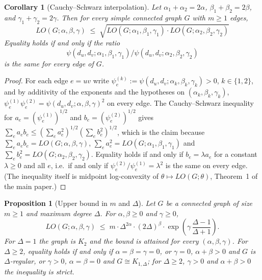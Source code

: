 \documentclass[a5paper, 10pt]{article}
\theoremstyle{plain}
\newtheorem{proposition}[theorem]{Proposition}
\newtheorem*{corollary}{Corollary}
\theoremstyle{remark}
\theoremstyle{definition}
\newcommand{\Wuzi}{LO(G;\alpha,\beta,\gamma)}
\begin{document}
  \begin{corollary}[Cauchy--Schwarz interpolation]\label{thm:cs}
  Let $\alpha_1 + \alpha_2 = 2\alpha$, $\beta_1 + \beta_2 = 2\beta$,
  and $\gamma_1 + \gamma_2 = 2\gamma$. Then for every simple
  connected graph $G$ with $m \ge 1$ edges,
  \[
  LO(G; \alpha, \beta, \gamma)
  \;\le\;
  \sqrt{LO(G; \alpha_1, \beta_1, \gamma_1)
         \cdot LO(G; \alpha_2, \beta_2, \gamma_2)}
  \]
  Equality holds if and only if the ratio
  \[
  \psi(d_u, d_v; \alpha_1, \beta_1, \gamma_1)/\psi(d_u, d_v; \alpha_2,
  \beta_2, \gamma_2)
  \]
  is the same for every edge of $G$.
  \end{corollary}
  \begin{proof}
  For each edge $e = uv$ write
  $\psi_e^{(k)} := \psi(d_u, d_v; \alpha_k, \beta_k, \gamma_k) > 0$,
  $k \in \{1, 2\}$, and by additivity of the exponents and the hypotheses on
  $(\alpha_k, \beta_k, \gamma_k)$,
  $\psi_e^{(1)}\psi_e^{(2)} = \psi(d_u, d_v; \alpha, \beta, \gamma)^2$
  on every edge. The Cauchy--Schwarz inequality for
  $a_e = (\psi_e^{(1)})^{1/2}$ and $b_e = (\psi_e^{(2)})^{1/2}$ gives
  $\sum_e a_e b_e \le (\sum_e a_e^2)^{1/2} (\sum_e b_e^2)^{1/2}$, which
  is the claim because $\sum_e a_e b_e = \Wuzi$,
  $\sum_e a_e^2 = LO(G; \alpha_1, \beta_1, \gamma_1)$ and
  $\sum_e b_e^2 = LO(G; \alpha_2, \beta_2, \gamma_2)$. Equality holds if
  and only if $b_e = \lambda a_e$ for a constant $\lambda \ge 0$ and all
  $e$, i.e.\ if and only if
  $\psi_e^{(2)}/\psi_e^{(1)} = \lambda^2$ is the same on every edge.
  (The inequality itself is midpoint log-convexity of
  $\theta \mapsto LO(G; \theta)$, Theorem~1 of the main paper.)
  \end{proof}

  \begin{proposition}[Upper bound in $m$ and $\Delta$]\label{thm:upper_Delta}
  Let $G$ be a connected graph of size $m \ge 1$ and maximum degree $\Delta$. For
  $\alpha, \beta \ge 0$ and $\gamma \ge 0$,
  \begin{equation}\label{eq:upper_Delta}
  \Wuzi \;\le\; m \cdot \Delta^{2\alpha} \cdot (2\Delta)^{\beta}
  \cdot \exp\!\left(\gamma\,\frac{\Delta - 1}{\Delta + 1}\right).
  \end{equation}
  For $\Delta = 1$ the graph is $K_2$ and the bound is attained for every
  $(\alpha,\beta,\gamma)$. For $\Delta \ge 2$, equality holds if and only
  if $\alpha = \beta = \gamma = 0$, or $\gamma = 0$, $\alpha + \beta > 0$
  and $G$ is $\Delta$-regular, or $\gamma > 0$, $\alpha = \beta = 0$ and
  $G \cong K_{1,\Delta}$; for $\Delta \ge 2$, $\gamma > 0$ and
  $\alpha + \beta > 0$ the inequality is strict.
  \end{proposition}
\end{document}
